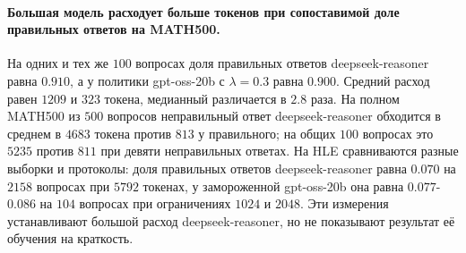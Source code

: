 \documentclass[11pt]{article}
\begin{document}
\paragraph{Большая модель расходует больше токенов при сопоставимой доле правильных ответов на MATH500.} На одних и тех же $100$ вопросах доля правильных ответов deepseek-reasoner равна $0.910$, а у политики gpt-oss-20b с $\lambda=0.3$ равна $0.900$. Средний расход равен $1209$ и $323$ токена, медианный различается в $2.8$ раза. На полном MATH500 из $500$ вопросов неправильный ответ deepseek-reasoner обходится в среднем в $4683$ токена против $813$ у правильного; на общих $100$ вопросах это $5235$ против $811$ при девяти неправильных ответах. На HLE сравниваются разные выборки и протоколы: доля правильных ответов deepseek-reasoner равна $0.070$ на $2158$ вопросах при $5792$ токенах, у замороженной gpt-oss-20b она равна $0.077$-$0.086$ на $104$ вопросах при ограничениях $1024$ и $2048$. Эти измерения устанавливают большой расход deepseek-reasoner, но не показывают результат её обучения на краткость.
\end{document}
